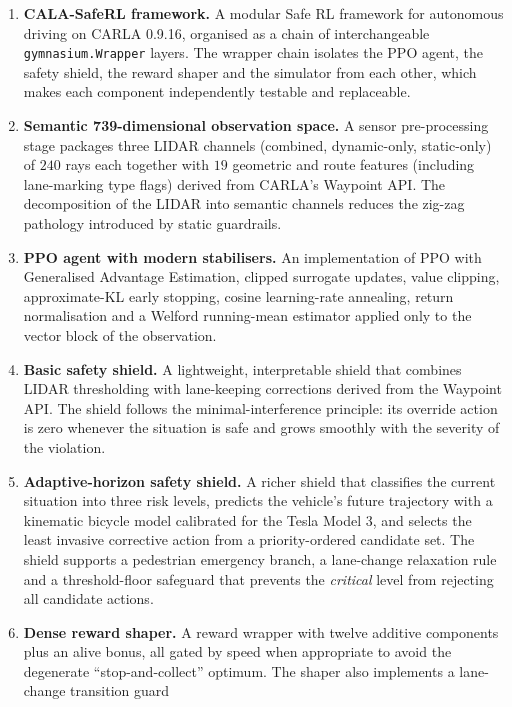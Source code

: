 \begin{enumerate}
  \item \textbf{CALA-SafeRL framework.} A modular Safe RL framework for autonomous driving on
        CARLA 0.9.16, organised as a chain of interchangeable \texttt{gymnasium.Wrapper} layers.
        The wrapper chain isolates the PPO agent, the safety shield, the reward shaper and the
        simulator from each other, which makes each component independently testable and
        replaceable.
  \item \textbf{Semantic 739-dimensional observation space.} A sensor pre-processing stage
        packages three LIDAR channels (combined, dynamic-only, static-only) of \(240\) rays each
        together with \(19\) geometric and route features (including lane-marking type flags)
        derived from CARLA's Waypoint API. The decomposition of the LIDAR into semantic channels
        reduces the zig-zag pathology introduced by static guardrails.
  \item \textbf{PPO agent with modern stabilisers.} An implementation of PPO with Generalised
        Advantage Estimation, clipped surrogate updates, value clipping, approximate-KL early
        stopping, cosine learning-rate annealing, return normalisation and a Welford running-mean
        estimator applied only to the vector block of the observation.
  \item \textbf{Basic safety shield.} A lightweight, interpretable shield that combines LIDAR
        thresholding with lane-keeping corrections derived from the Waypoint API. The shield
        follows the minimal-interference principle: its override action is zero whenever the
        situation is safe and grows smoothly with the severity of the violation.
  \item \textbf{Adaptive-horizon safety shield.} A richer shield that classifies the current
        situation into three risk levels, predicts the vehicle's future trajectory with a
        kinematic bicycle model calibrated for the Tesla Model 3, and selects the least invasive
        corrective action from a priority-ordered candidate set. The shield supports a
        pedestrian emergency branch, a lane-change relaxation rule and a threshold-floor safeguard that
        prevents the \emph{critical} level from rejecting all candidate actions.
  \item \textbf{Dense reward shaper.} A reward wrapper with twelve additive components plus an
        alive bonus, all gated by speed when appropriate to avoid the degenerate
        ``stop-and-collect'' optimum. The shaper also implements a lane-change transition guard

\end{enumerate}

